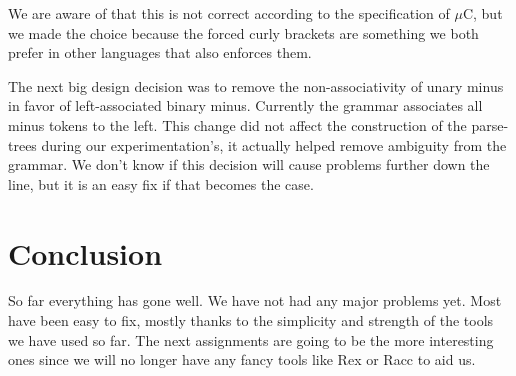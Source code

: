 We are aware of that this is not correct according to the specification of $\mu$C, but we made the choice because the forced curly brackets are something we both prefer in other languages that also enforces them.

The next big design decision was to remove the non-associativity of unary minus in favor of left-associated binary minus. Currently the grammar associates all minus tokens to the left. This change did not affect the construction of the parse-trees during our experimentation's, it actually helped remove ambiguity from the grammar. We don't know if this decision will cause problems further down the line, but it is an easy fix if that becomes the case.

\section{Conclusion}
So far everything has gone well. We have not had any major problems yet. Most have been easy to fix, mostly thanks to the simplicity and strength of the tools we have used so far. The next assignments are going to be the more interesting ones since we will no longer have any fancy tools like Rex or Racc to aid us.
